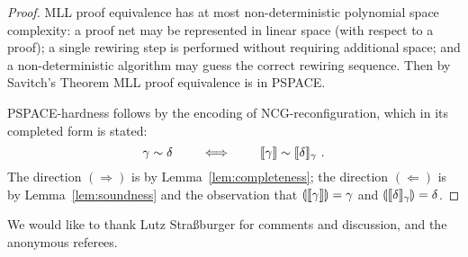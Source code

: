 \documentclass{sigplanconf}
\let\capsabbrev=\uppercase
\begin{document}
\begin{proof}
\capsabbrev{mll} proof equivalence has at most non-deterministic polynomial space complexity: a proof net may be represented in linear space (with respect to a proof); a single rewiring step is performed without requiring additional space; and a non-deterministic algorithm may guess the correct rewiring sequence.
%
Then by Savitch's Theorem \cite{Savitch-1970} \capsabbrev{mll} proof equivalence is in \capsabbrev{pspace}.


\capsabbrev{pspace}-hardness follows by the encoding of \capsabbrev{ncg}-reconfiguration, which in its completed form is stated:
\[
	\gamma\perm\delta \qquad\iff\qquad \itn\gamma\perm\itn\delta_\gamma~.
\]
%
The direction $(\Rightarrow)$ is by Lemma~\ref{lem:completeness}; the direction $(\Leftarrow)$ is by Lemma~\ref{lem:soundness} and the observation that $\llparenthesis\llbracket\gamma\rrbracket\rrparenthesis=\gamma$ and $\llparenthesis\llbracket\delta\rrbracket_\gamma\rrparenthesis=\delta$.
%
\end{proof}


\acks

We would like to thank Lutz Stra{\ss}burger for comments and discussion, and the anonymous referees.




\end{document}
